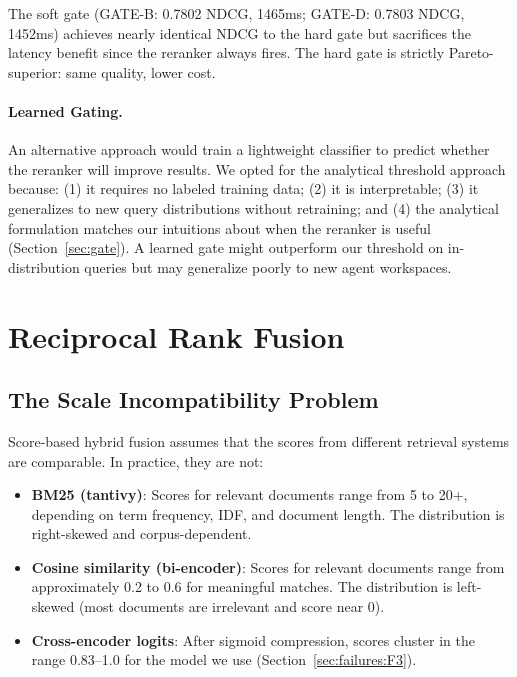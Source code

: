 \documentclass[11pt]{article}
\begin{document}
The soft gate (GATE-B: 0.7802 NDCG, 1465ms; GATE-D: 0.7803 NDCG, 1452ms) achieves
nearly identical NDCG to the hard gate but sacrifices the latency benefit since the
reranker always fires. The hard gate is strictly Pareto-superior: same quality, lower
cost.

\paragraph{Learned Gating.}
An alternative approach would train a lightweight classifier to predict whether the
reranker will improve results. We opted for the analytical threshold approach because:
(1) it requires no labeled training data; (2) it is interpretable; (3) it generalizes
to new query distributions without retraining; and (4) the analytical formulation
matches our intuitions about when the reranker is useful (Section~\ref{sec:gate}).
A learned gate might outperform our threshold on in-distribution queries but may
generalize poorly to new agent workspaces.

\section{Reciprocal Rank Fusion}
\label{sec:rrf}

\subsection{The Scale Incompatibility Problem}
\label{sec:rrf:motivation}

Score-based hybrid fusion assumes that the scores from different retrieval systems are
comparable. In practice, they are not:

\begin{itemize}[leftmargin=2em, itemsep=3pt]
  \item \textbf{BM25 (tantivy)}: Scores for relevant documents range from 5 to 20+,
  depending on term frequency, IDF, and document length. The distribution is
  right-skewed and corpus-dependent.
  \item \textbf{Cosine similarity (bi-encoder)}: Scores for relevant documents range
  from approximately 0.2 to 0.6 for meaningful matches. The distribution is
  left-skewed (most documents are irrelevant and score near 0).
  \item \textbf{Cross-encoder logits}: After sigmoid compression, scores cluster in the
  range 0.83--1.0 for the model we use (Section~\ref{sec:failures:F3}).
\end{itemize}
\end{document}
